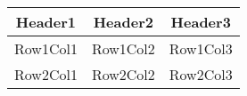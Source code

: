\documentclass{article}
\begin{document}
\begin{tabular}{ |c|c|c| }
 \hline
 Header1 & Header2 & Header3 \\
 \hline
 Row1Col1 & Row1Col2 & Row1Col3 \\
 Row2Col1 & Row2Col2 & Row2Col3 \\
 \hline
\end{tabular}
\end{document}
